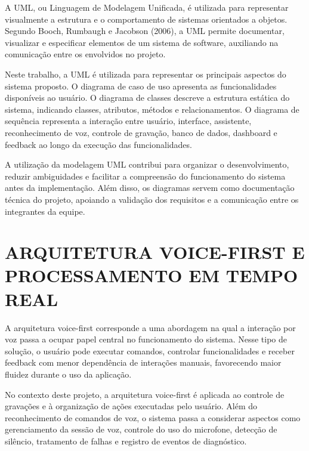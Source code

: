 \documentclass[12pt,oneside,a4paper,brazil,final]{abntex2}
\begin{document}
A UML, ou Linguagem de Modelagem Unificada, é utilizada para representar visualmente a estrutura e o comportamento de sistemas orientados a objetos. Segundo Booch, Rumbaugh e Jacobson (2006), a UML permite documentar, visualizar e especificar elementos de um sistema de software, auxiliando na comunicação entre os envolvidos no projeto.



Neste trabalho, a UML é utilizada para representar os principais aspectos do sistema proposto. O diagrama de caso de uso apresenta as funcionalidades disponíveis ao usuário. O diagrama de classes descreve a estrutura estática do sistema, indicando classes, atributos, métodos e relacionamentos. O diagrama de sequência representa a interação entre usuário, interface, assistente, reconhecimento de voz, controle de gravação, banco de dados, dashboard e feedback ao longo da execução das funcionalidades.



A utilização da modelagem UML contribui para organizar o desenvolvimento, reduzir ambiguidades e facilitar a compreensão do funcionamento do sistema antes da implementação. Além disso, os diagramas servem como documentação técnica do projeto, apoiando a validação dos requisitos e a comunicação entre os integrantes da equipe.



\section{ARQUITETURA VOICE-FIRST E PROCESSAMENTO EM TEMPO REAL}



A arquitetura voice-first corresponde a uma abordagem na qual a interação por voz passa a ocupar papel central no funcionamento do sistema. Nesse tipo de solução, o usuário pode executar comandos, controlar funcionalidades e receber feedback com menor dependência de interações manuais, favorecendo maior fluidez durante o uso da aplicação.



No contexto deste projeto, a arquitetura voice-first é aplicada ao controle de gravações e à organização de ações executadas pelo usuário. Além do reconhecimento de comandos de voz, o sistema passa a considerar aspectos como gerenciamento da sessão de voz, controle do uso do microfone, detecção de silêncio, tratamento de falhas e registro de eventos de diagnóstico.
\end{document}
